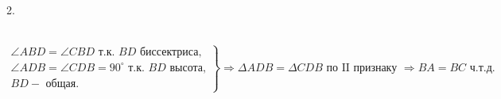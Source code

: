 2.  \begin{figure}[ht!]
\end{figure}\\
$\left.\begin{array}{l}\angle ABD=\angle CBD\text{ т.к. }BD\text{ биссектриса,}\\
\angle ADB=\angle CDB=90^\circ \text{ т.к. }BD\text{ высота,}\\
BD - \text{ общая.}   \end{array}\right\}\Rightarrow
\Delta ADB=\Delta CDB\text{ по II признаку }\Rightarrow BA=BC\text{ ч.т.д.} $\\
